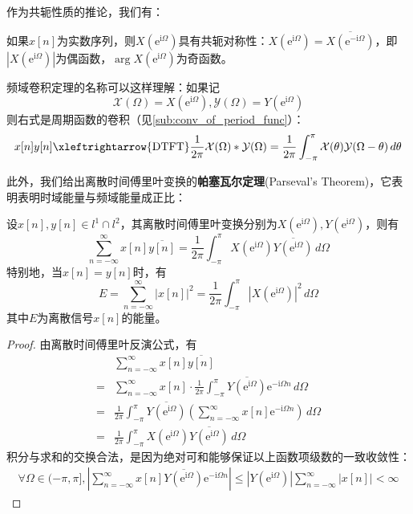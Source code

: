 作为共轭性质的推论，我们有：
\begin{corollary}
    如果$x[n]$为实数序列，则$X(\mathrm{e}^{\mathrm{i}\Omega})$具有共轭对称性：$X(\mathrm{e}^{\mathrm{i}\Omega})=\overline{X\left(\mathrm{e}^{-\mathrm{i}\Omega}\right)}$，即$|X(\mathrm{e}^{\mathrm{i}\Omega})|$为偶函数，$\arg X(\mathrm{e}^{\mathrm{i}\Omega})$为奇函数。
\end{corollary}

频域卷积定理的名称可以这样理解：如果记
$$\mathcal{X} (\Omega)=X(\mathrm{e}^{\mathrm{i}\Omega}),\mathcal{Y} (\Omega)=Y(\mathrm{e}^{\mathrm{i}\Omega})$$
则右式是周期函数的卷积（见\ref{sub:conv_of_period_func}）：
\[x[n]y[n]\xleftrightarrow{\mathrm{DTFT}}\frac{1}{2\pi}\mathcal{X} (\Omega)*\mathcal{Y} (\Omega)=\frac{1}{2\pi}\int_{-\pi}^{\pi}\mathcal{X} (\theta)\mathcal{Y} (\Omega-\theta)\,d\theta\]

此外，我们给出离散时间傅里叶变换的\textbf{帕塞瓦尔定理}(Parseval's Theorem)，它表明表明时域能量与频域能量成正比：
\begin{theorem}[离散时间傅里叶变换的帕塞瓦尔定理]
    设$x[n],y[n]\in l^1\cap l^2$，其离散时间傅里叶变换分别为$X(\mathrm{e}^{\mathrm{i}\Omega}),Y(\mathrm{e}^{\mathrm{i}\Omega})$，则有
    \[\sum_{n=-\infty}^{\infty}x[n]\overline{y[n]}=\frac{1}{2\pi}\int_{-\pi}^{\pi}X(\mathrm{e}^{\mathrm{i}\Omega})\overline{Y(\mathrm{e}^{\mathrm{i}\Omega})}\,d\Omega\]
    特别地，当$x[n]=y[n]$时，有
    \[E=\sum_{n=-\infty}^{\infty}|x[n]|^2=\frac{1}{2\pi}\int_{-\pi}^{\pi}|X(\mathrm{e}^{\mathrm{i}\Omega})|^2\,d\Omega\]
    其中$E$为离散信号$x[n]$的能量。
\end{theorem}
\begin{proof}
    由离散时间傅里叶反演公式，有
    \begin{align*}
        &\sum_{n=-\infty}^{\infty}x[n]\overline{y[n]}\\
        =&\sum_{n=-\infty}^{\infty}x[n]\cdot\frac{1}{2\pi}\int_{-\pi}^{\pi}\overline{Y(\mathrm{e}^{\mathrm{i}\Omega})}\mathrm{e}^{-\mathrm{i}\Omega n}\,d\Omega\\
        =&\frac{1}{2\pi}\int_{-\pi}^{\pi}\overline{Y(\mathrm{e}^{\mathrm{i}\Omega})}\left(\sum_{n=-\infty}^{\infty}x[n]\mathrm{e}^{-\mathrm{i}\Omega n}\right)\,d\Omega\\
        =&\frac{1}{2\pi}\int_{-\pi}^{\pi}X(\mathrm{e}^{\mathrm{i}\Omega})\overline{Y(\mathrm{e}^{\mathrm{i}\Omega})}\,d\Omega
    \end{align*}
    积分与求和的交换合法，是因为绝对可和能够保证以上函数项级数的一致收敛性：\begin{align*}
    \forall\Omega\in(-\pi,\pi],\left|\sum_{n=-\infty}^{\infty}x[n]\overline{Y(\mathrm{e}^{\mathrm{i}\Omega})}\mathrm{e}^{-\mathrm{i}\Omega n}\right|\leq\left|Y(\mathrm{e}^{\mathrm{i}\Omega})\right|\sum_{n=-\infty}^{\infty}|x[n]|<\infty
    \end{align*}
\end{proof}

